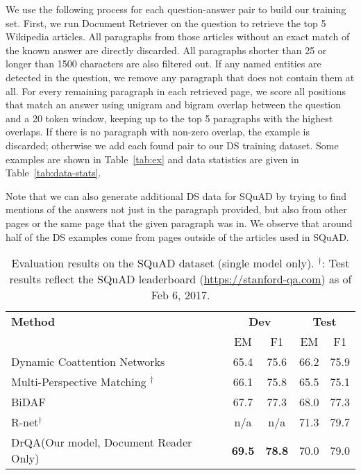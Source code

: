 \documentclass[11pt,a4paper]{article}
\newcommand\us{DrQA\xspace}
\newcommand\usr{Document Retriever\xspace}
\newcommand\usp{Document Reader\xspace}
\newcommand{\finalem}{70.0}
\newcommand{\finalf}{79.0}
\begin{document}
We use the following process for each question-answer pair to build our training set.
%
First, we run \usr on the question to retrieve the top 5 Wikipedia articles.
All paragraphs from those articles without an exact match of the known answer are directly discarded.
%
All paragraphs  shorter than 25 or longer than 1500  characters are also filtered out.
%
If any named entities are detected in the question, we remove any paragraph that does not contain them at all.
%
For every remaining paragraph in each retrieved page, we score all positions that match an answer using unigram and bigram overlap between the question and a 20 token window, keeping up to the top 5 paragraphs with the highest overlaps. If there is no paragraph with non-zero overlap, the example is discarded; otherwise we add each found pair to our DS training dataset. Some examples are shown in Table~\ref{tab:ex} and data statistics are given in Table~\ref{tab:data-stats}.

Note that we can also generate additional DS data for SQuAD by trying to find mentions of the answers not just in the paragraph provided, but also from other pages or the same page that the given paragraph was in. We observe that around half of the DS examples come from pages outside of the articles used in SQuAD.

\begin{table*}[t]
\begin{center}
\begin{tabular}{l|c@{\,\,\,\,}cc@{\,\,\,\,}c}
\hline
 \bf Method &  \multicolumn{2}{c}{\bf Dev} & \multicolumn{2}{c}{\bf Test} \\
&  EM & F1 & EM & F1 \\
\hline
Dynamic Coattention Networks \cite{xiong2016dynamic} & 65.4 & 75.6 & 66.2 & 75.9 \\
Multi-Perspective Matching \cite{wang2016multi}$^\dagger$   & 66.1 & 75.8 & 65.5 & 75.1 \\
BiDAF \cite{seo2016bidirectional} & 67.7 & 77.3 & 68.0 & 77.3 \\
R-net$^\dagger$   & n/a & n/a & 71.3 & 79.7 \\
\hline
\us (Our model, Document Reader Only) & \bf 69.5 & \bf 78.8 & {\finalem} & {\finalf} \\
\hline
\end{tabular}
\end{center}
\caption{\label{tab:squad-res} Evaluation results on the SQuAD dataset (single model only). $^\dagger$: Test results reflect the SQuAD leaderboard {\small(\url{https://stanford-qa.com})} as of Feb 6, 2017.}
\end{table*}
\end{document}
